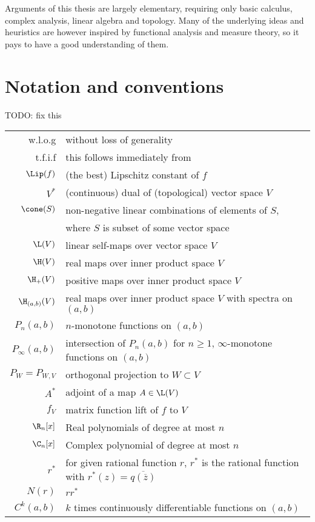 Arguments of this thesis are largely elementary, requiring only basic calculus, complex analysis, linear algebra and topology. Many of the underlying ideas and heuristics are however inspired by functional analysis and measure theory, so it pays to have a good understanding of them.

\section{Notation and conventions}

TODO: fix this

\begin{tabular}{r l}
	w.l.o.g & without loss of generality \\
	t.f.i.f & this follows immediately from \\
	$\Lip(f)$ & (the best) Lipschitz constant of $f$ \\
	$V^{*}$ & (continuous) dual of (topological) vector space $V$ \\
	$\cone(S)$ & non-negative linear combinations of elements of $S$, \\
	& where $S$ is subset of some vector space\\
	$\L(V)$ & linear self-maps over vector space $V$ \\
	$\H(V)$ & real maps over inner product space $V$ \\
	$\H_{+}(V)$ & positive maps over inner product space $V$ \\
	$\H_{(a, b)}(V)$ & real maps over inner product space $V$ with spectra on $(a, b)$ \\
	$P_{n}(a, b)$ & $n$-monotone functions on $(a, b)$ \\
	$P_{\infty}(a, b)$ & intersection of $P_{n}(a, b)$ for $n \geq 1$, $\infty$-monotone functions on $(a, b)$ \\
	$P_{W} = P_{W, V}$ & orthogonal projection to $W \subset V$ \\
	$A^{*}$ & adjoint of a map $A \in \L(V)$ \\
	$f_{V}$ & matrix function lift of $f$ to $V$ \\
	$\R_{n}[x]$ & Real polynomials of degree at most $n$\\
	$\C_{n}[x]$ & Complex polynomial of degree at most $n$\\
	$r^{*}$ & for given rational function $r$, $r^{*}$ is the rational function with $r^{*}(z) = \overline{q(\overline{z})}$ \\
	$N(r)$ & $r r^{*}$ \\
	$C^{k}(a, b)$ & $k$ times continuously differentiable functions on $(a, b)$ \\
\end{tabular}
